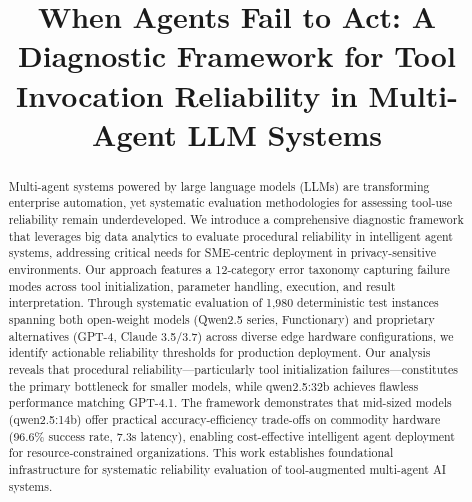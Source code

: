 \documentclass[conference]{IEEEtran}
\begin{document}
\title{When Agents Fail to Act: A Diagnostic Framework for Tool Invocation Reliability in Multi-Agent LLM Systems}

\author{
}

\maketitle

\begin{abstract}
Multi-agent systems powered by large language models (LLMs) are transforming enterprise automation, yet systematic evaluation methodologies for assessing tool-use reliability remain underdeveloped. We introduce a comprehensive diagnostic framework that leverages big data analytics to evaluate procedural reliability in intelligent agent systems, addressing critical needs for SME-centric deployment in privacy-sensitive environments. Our approach features a 12-category error taxonomy capturing failure modes across tool initialization, parameter handling, execution, and result interpretation. Through systematic evaluation of 1,980 deterministic test instances spanning both open-weight models (Qwen2.5 series, Functionary) and proprietary alternatives (GPT-4, Claude 3.5/3.7) across diverse edge hardware configurations, we identify actionable reliability thresholds for production deployment. Our analysis reveals that procedural reliability---particularly tool initialization failures---constitutes the primary bottleneck for smaller models, while qwen2.5:32b achieves flawless performance matching GPT-4.1. The framework demonstrates that mid-sized models (qwen2.5:14b) offer practical accuracy-efficiency trade-offs on commodity hardware (96.6\% success rate, 7.3s latency), enabling cost-effective intelligent agent deployment for resource-constrained organizations. This work establishes foundational infrastructure for systematic reliability evaluation of tool-augmented multi-agent AI systems.
\end{abstract}
\end{document}
